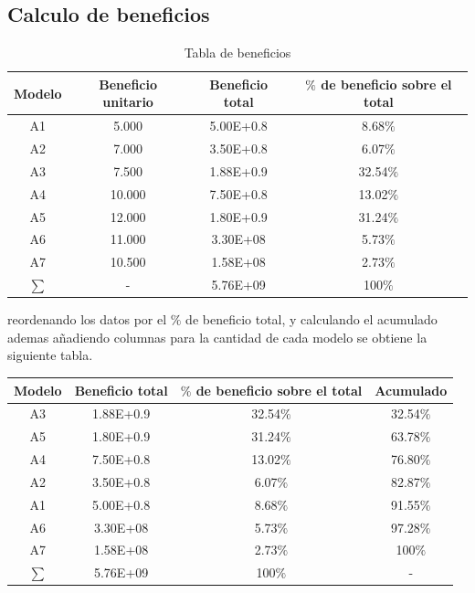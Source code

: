 \documentclass{report}
\begin{document}
\begin{raggedright}
\section{Calculo de beneficios}
\begin{table}[h]
	\centering
	\begin{tabular}{cccc}
		\toprule
		\textbf{Modelo} & \textbf{Beneficio unitario} & \textbf{Beneficio total} & \textbf{$\%$ de beneficio sobre el total} \\
		\midrule
		A1 & 5.000  & 5.00E+0.8 & 8.68$\%$ \\
		A2 & 7.000  & 3.50E+0.8 & 6.07$\%$ \\
		A3 & 7.500  & 1.88E+0.9 & 32.54$\%$ \\
		A4 & 10.000 & 7.50E+0.8 & 13.02$\%$ \\
		A5 & 12.000 & 1.80E+0.9 & 31.24$\%$ \\
		A6 & 11.000 & 3.30E+08  & 5.73$\%$\\
		A7 & 10.500 & 1.58E+08  & 2.73$\%$\\
		\midrule
		$\sum$ & - & 5.76E+09 & 100$\%$ \\
		\bottomrule
		\end{tabular}
	\caption{Tabla de beneficios}
\end{table}
reordenando los datos por el $\%$ de beneficio total, y calculando el acumulado ademas añadiendo columnas para la cantidad de cada modelo se obtiene la siguiente tabla.\\
\begin{table}[h]
	\centering
	\begin{tabular}{cccc}
		\toprule
		\textbf{Modelo} & \textbf{Beneficio total} & \textbf{$\%$ de beneficio sobre el total} & \textbf{Acumulado} \\
		\midrule
		A3 & 1.88E+0.9 & 32.54$\%$ & 32.54$\%$ \\
		A5 & 1.80E+0.9 & 31.24$\%$ & 63.78$\%$ \\
		A4 & 7.50E+0.8 & 13.02$\%$ & 76.80$\%$ \\
		A2 & 3.50E+0.8 & 6.07$\%$ & 82.87$\%$  \\
		A1 & 5.00E+0.8 & 8.68$\%$ & 91.55$\%$  \\
		A6 & 3.30E+08  & 5.73$\%$& 97.28$\%$   \\
		A7 & 1.58E+08  & 2.73$\%$&100$\%$      \\
		\midrule
		$\sum$ & 5.76E+09 & 100$\%$ & - \\

\end{tabular}
\end{table}
\end{raggedright}
\end{document}
